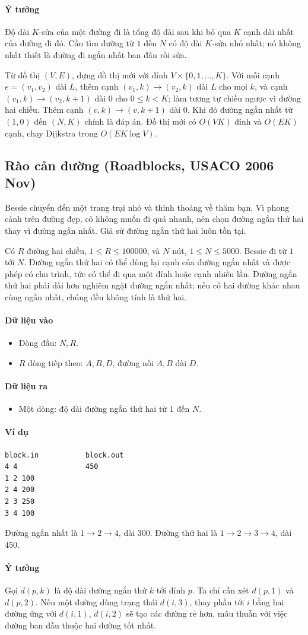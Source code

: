 \documentclass[11pt]{article}
\newcommand{\problem}[1]{\subsection{#1}}
\newcommand{\iosec}[1]{\paragraph{#1}}
\newcommand{\bigO}[1]{\ensuremath{O(#1)}}
\begin{document}
\iosec{Ý tưởng}
Độ dài \(K\)-sửa của một đường đi là tổng độ dài sau khi bỏ qua \(K\) cạnh dài nhất của đường đi đó. Cần tìm đường từ \(1\) đến \(N\) có độ dài \(K\)-sửa nhỏ nhất; nó không nhất thiết là đường đi ngắn nhất ban đầu rồi sửa.

Từ đồ thị \((V,E)\), dựng đồ thị mới với đỉnh \(V\times\{0,1,\ldots,K\}\). Với mỗi cạnh \(e=(v_1,v_2)\) dài \(L\), thêm cạnh \((v_1,k)\to(v_2,k)\) dài \(L\) cho mọi \(k\), và cạnh \((v_1,k)\to(v_2,k+1)\) dài \(0\) cho \(0\le k<K\); làm tương tự chiều ngược vì đường hai chiều. Thêm cạnh \((v,k)\to(v,k+1)\) dài \(0\). Khi đó đường ngắn nhất từ \((1,0)\) đến \((N,K)\) chính là đáp án. Đồ thị mới có \(\bigO{VK}\) đỉnh và \(\bigO{EK}\) cạnh, chạy Dijkstra trong \(\bigO{EK\log V}\).

\problem{Rào cản đường (Roadblocks, USACO 2006 Nov)}

Bessie chuyển đến một trang trại nhỏ và thỉnh thoảng về thăm bạn. Vì phong cảnh trên đường đẹp, cô không muốn đi quá nhanh, nên chọn đường ngắn thứ hai thay vì đường ngắn nhất. Giả sử đường ngắn thứ hai luôn tồn tại.

Có \(R\) đường hai chiều, \(1 \le R \le 100000\), và \(N\) nút, \(1 \le N \le 5000\). Bessie đi từ \(1\) tới \(N\). Đường ngắn thứ hai có thể dùng lại cạnh của đường ngắn nhất và được phép có chu trình, tức có thể đi qua một đỉnh hoặc cạnh nhiều lần. Đường ngắn thứ hai phải dài hơn nghiêm ngặt đường ngắn nhất; nếu có hai đường khác nhau cùng ngắn nhất, chúng đều không tính là thứ hai.

\iosec{Dữ liệu vào}
\begin{itemize}
  \item Dòng đầu: \(N,R\).
  \item \(R\) dòng tiếp theo: \(A,B,D\), đường nối \(A,B\) dài \(D\).
\end{itemize}

\iosec{Dữ liệu ra}
\begin{itemize}
  \item Một dòng: độ dài đường ngắn thứ hai từ \(1\) đến \(N\).
\end{itemize}

\iosec{Ví dụ}
\begin{verbatim}
block.in           block.out
4 4                450
1 2 100
2 4 200
2 3 250
3 4 100
\end{verbatim}

Đường ngắn nhất là \(1\to2\to4\), dài \(300\). Đường thứ hai là \(1\to2\to3\to4\), dài \(450\).

\iosec{Ý tưởng}
Gọi \(d(p,k)\) là độ dài đường ngắn thứ \(k\) tới đỉnh \(p\). Ta chỉ cần xét \(d(p,1)\) và \(d(p,2)\). Nếu một đường dùng trạng thái \(d(i,3)\), thay phần tới \(i\) bằng hai đường ứng với \(d(i,1)\), \(d(i,2)\) sẽ tạo các đường rẻ hơn, mâu thuẫn với việc đường ban đầu thuộc hai đường tốt nhất.
\end{document}
